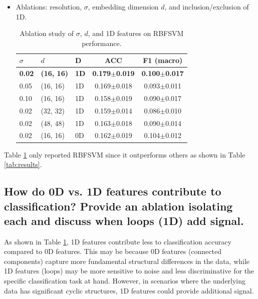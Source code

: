 \documentclass[11pt]{article}
\begin{document}
\begin{itemize}
        \item Ablations: resolution, $\sigma$, embedding dimension $d$, and inclusion/exclusion of 1D.
            \begin{table}[h!]
                \centering
                \begin{tabular}{lllcc}
                \toprule
                \textbf{$\sigma$} & \textbf{$d$} & \textbf{D} & \textbf{ACC} & \textbf{F1 (macro)} \\
                \midrule
                \textbf{0.02} & \textbf{(16, 16)} & \textbf{1D} & \textbf{0.179$\pm$0.019} & \textbf{0.100$\pm$0.017} \\
                0.05 & (16, 16) & 1D & 0.169$\pm$0.018 & 0.093$\pm$0.011 \\
                0.10 & (16, 16) & 1D & 0.158$\pm$0.019 & 0.090$\pm$0.017 \\
                0.02 & (32, 32) & 1D & 0.159$\pm$0.014 & 0.086$\pm$0.010 \\
                0.02 & (48, 48) & 1D & 0.163$\pm$0.018 & 0.090$\pm$0.014 \\
                0.02 & (16, 16) & 0D & 0.162$\pm$0.019 & 0.104$\pm$0.012 \\
                \bottomrule
                \end{tabular}
                \caption{Ablation study of $\sigma$, $d$, and 1D features on RBFSVM performance.}
                \label{tab:ablation}
            \end{table}
    \end{itemize}

    Table \ref{tab:ablation} only reported RBFSVM since it outperforms others as shown in Table \ref{tab:results}.
    

\subsection{How do 0D vs. 1D features contribute to classification? Provide an ablation isolating each
and discuss when loops (1D) add signal.}

As shown in Table \ref{tab:ablation}, 1D features contribute less to classification accuracy compared to 0D features. 
This may be because 0D features (connected components) capture more fundamental structural differences in the data, 
while 1D features (loops) may be more sensitive to noise and less discriminative for the specific classification task at hand. 
However, in scenarios where the underlying data has significant cyclic structures, 1D features could provide additional signal.
\end{document}
